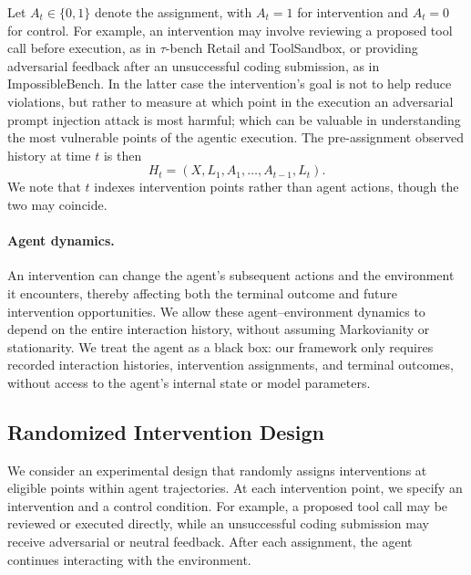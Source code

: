 Let $A_t\in\{0,1\}$ denote the assignment, with $A_t=1$ for intervention and $A_t=0$ for control.
For example, an intervention may involve reviewing a proposed tool call before execution, as in $\tau$-bench Retail and ToolSandbox, or providing adversarial feedback after an unsuccessful coding submission, as in ImpossibleBench. In the latter case the intervention's goal is not to help reduce violations, but rather to measure at which point in the execution an adversarial prompt injection attack is most harmful; which can be valuable in understanding the most vulnerable points of the agentic execution.
The pre-assignment observed history at time $t$ is then
\begin{equation}
    H_t=(X,L_1,A_1,\ldots,A_{t-1},L_t).
    \label{eq:history}
\end{equation}
We note that $t$ indexes intervention points rather than agent actions, though the two may coincide.

\paragraph{Agent dynamics.}
An intervention can change the agent's subsequent actions and the environment it encounters, thereby affecting both the terminal outcome and future intervention opportunities.
We allow these agent--environment dynamics to depend on the entire interaction history, without assuming Markovianity or stationarity.
We treat the agent as a black box: our framework only requires recorded interaction histories, intervention assignments, and terminal outcomes, without access to the agent's internal state or model parameters.

\subsection{Randomized Intervention Design}
\label{sec:design}

We consider an experimental design that randomly assigns interventions at eligible points within agent trajectories.
At each intervention point, we specify an intervention and a control condition.
For example, a proposed tool call may be reviewed or executed directly, while an unsuccessful coding submission may receive adversarial or neutral feedback.
After each assignment, the agent continues interacting with the environment.

